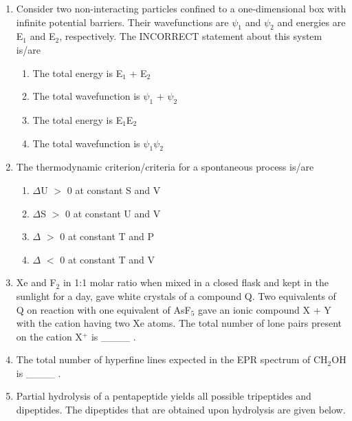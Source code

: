 \documentclass[journal,12pt,onecolumn]{IEEEtran}
\theoremstyle{remark}
\begin{document}
\begin{enumerate}
\item Consider two non-interacting particles confined to a one-dimensional box with infinite potential barriers. Their wavefunctions are $\psi_{1}$ and $\psi_{2}$ and energies are E$_{1}$ and E$_{2}$, respectively. The INCORRECT statement about this system is/are
    \begin{enumerate}
        \item The total energy is E$_{1}$ + E$_{2}$
        \item The total wavefunction is $\psi_{1}$ + $\psi_{2}$
        \item The total energy is E$_{1}$E$_{2}$
        \item The total wavefunction is $\psi_{1}\psi_{2}$
    \end{enumerate}      \hfill{}



\item The thermodynamic criterion/criteria for a spontaneous process is/are
    \begin{enumerate}
        \item $\Delta$U $>$ 0 at constant S and V
        \item $\Delta$S $>$ 0 at constant U and V
        \item $\Delta$ $>$ 0 at constant T and P
        \item $\Delta$ $<$ 0 at constant T and V
    \end{enumerate}      \hfill{}



\item Xe and F$_{2}$ in 1:1 molar ratio when mixed in a closed flask and kept in the sunlight for a day, gave white crystals of a compound Q. Two equivalents of Q on reaction with one equivalent of AsF$_{5}$ gave an ionic compound X + Y with the cation having two Xe atoms. The total number of lone pairs present on the cation X$^{+}$ is \_\_\_\_ . \hfill{}


\item The total number of hyperfine lines expected in the EPR spectrum of CH$_{2}$OH  is \_\_\_\_ . \hfill{}




\item Partial hydrolysis of a pentapeptide yields all possible tripeptides and dipeptides. The dipeptides that are obtained upon hydrolysis are given below.


\end{enumerate}
\end{document}
